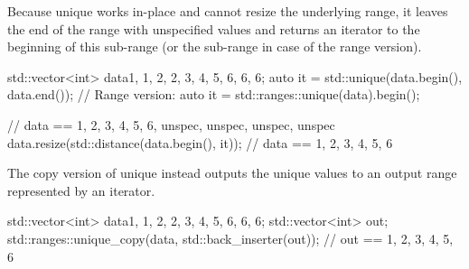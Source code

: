 

Because unique works in-place and cannot resize the underlying range, it leaves the end of the range with unspecified values and returns an iterator to the beginning of this sub-range (or the sub-range in case of the range version).

\begin{box-note}
\begin{cppcode}
std::vector<int> data{1, 1, 2, 2, 3, 4, 5, 6, 6, 6};
auto it = std::unique(data.begin(), data.end());
// Range version: auto it = std::ranges::unique(data).begin();

// data == {1, 2, 3, 4, 5, 6, unspec, unspec, unspec, unspec}
data.resize(std::distance(data.begin(), it));
// data == {1, 2, 3, 4, 5, 6}
\end{cppcode}
\end{box-note}



The copy version of unique instead outputs the unique values to an output range represented by an iterator.

\begin{box-note}
\begin{cppcode}
std::vector<int> data{1, 1, 2, 2, 3, 4, 5, 6, 6, 6};
std::vector<int> out;
std::ranges::unique_copy(data, std::back_inserter(out));
// out == {1, 2, 3, 4, 5, 6}
\end{cppcode}
\end{box-note}